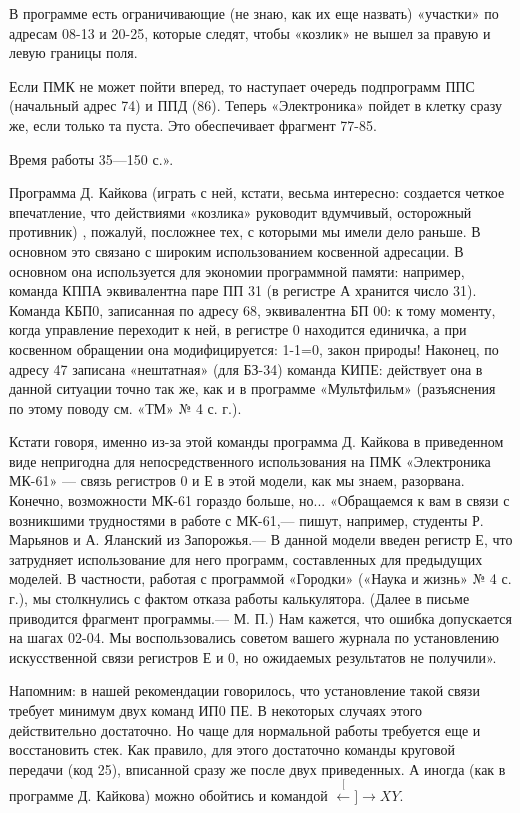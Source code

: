 \documentclass[11pt,a4paper,oneside]{article}
\def\XY{$\stackrel[\leftarrow]{\rightarrow}{XY}$}
\begin{document}
В программе есть ограничивающие (не знаю, как их еще назвать) «участки» по адресам 08-13 и 20-25, которые следят, чтобы «козлик» не вышел за правую и левую границы поля.

Если ПМК не может пойти вперед, то наступает очередь подпрограмм ППС (начальный адрес 74) и ППД (86). Теперь «Электроника» пойдет в клетку сразу же, если только та пуста. Это обеспечивает фрагмент 77-85.

Время работы 35—150 с.».

Программа Д. Кайкова (играть с ней, кстати, весьма интересно: создается четкое впечатление, что действиями «козлика» руководит вдумчивый, осторожный противник) , пожалуй, посложнее тех, с которыми мы имели дело раньше. В основном это связано с широким использованием косвенной адресации. В основном она используется для экономии программной памяти: например, команда КППА эквивалентна паре ПП 31 (в регистре А хранится число 31). Команда КБП0, записанная по адресу 68, эквивалентна БП 00: к тому моменту, когда управление переходит к ней, в регистре 0 находится единичка, а при косвенном обращении она модифицируется: 1-1=0, закон природы! Наконец, по адресу 47 записана «нештатная» (для БЗ-34) команда КИПЕ: действует она в данной ситуации точно так же, как и в программе «Мультфильм» (разъяснения по этому поводу см. «ТМ» № 4 с. г.).

Кстати говоря, именно из-за этой команды программа Д. Кайкова в приведенном виде непригодна для непосредственного использования на ПМК «Электроника МК-61» — связь регистров 0 и Е в этой модели, как мы знаем, разорвана. Конечно, возможности МК-61 гораздо больше, но... «Обращаемся к вам в связи с возникшими трудностями в работе с МК-61,— пишут, например, студенты Р. Марьянов и А. Яланский из Запорожья.— В данной модели введен регистр Е, что затрудняет использование для него программ, составленных для предыдущих моделей. В частности, работая с программой «Городки» («Наука и жизнь» № 4 с. г.), мы столкнулись с фактом отказа работы калькулятора. (Далее в письме приводится фрагмент программы.— М. П.) Нам кажется, что ошибка допускается на шагах 02-04. Мы воспользовались советом вашего журнала по установлению искусственной связи регистров Е и 0, но ожидаемых результатов не получили».

Напомним: в нашей рекомендации говорилось, что установление такой связи требует минимум двух команд ИП0 ПЕ. В некоторых случаях этого действительно достаточно. Но чаще для нормальной работы требуется еще и восстановить стек. Как правило, для этого достаточно команды круговой передачи (код 25), вписанной сразу же после двух приведенных. А иногда (как в программе Д. Кайкова) можно обойтись и командой \XY.
\end{document}
